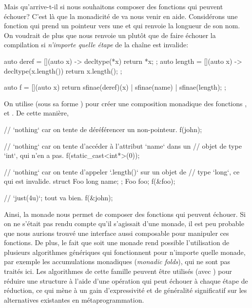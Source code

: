 Mais qu'arrive-t-il si nous souhaitons composer des fonctions qui peuvent
échouer? C'est là que la monadicité de  va nous venir en aide.
Considérons  une fonction qui prend un pointeur vers une 
et qui renvoie la longueur de son nom. On voudrait de plus que  nous
renvoie un  plutôt que de faire échouer la compilation si
\textit{n'importe quelle étape} de la chaîne est invalide:
\begin{cpp}
    auto deref = [](auto x) -> decltype(*x) { return *x; };
    auto length = [](auto x) -> decltype(x.length()) { return x.length(); };

    auto f = [](auto x) {
        return sfinae(deref)(x) | sfinae(name)
                                | sfinae(length);
    };
\end{cpp}

On utilise  (sous sa forme ) pour créer une
composition monadique des fonctions , 
et . De cette manière,
\begin{cpp}
    // `nothing` car on tente de déréférencer un non-pointeur.
    f(john);

    // `nothing` car on tente d'accéder à l'attribut `name` dans un
    // objet de type `int`, qui n'en a pas.
    f(static_cast<int*>(0));

    // `nothing` car on tente d'appeler `.length()` sur un objet de
    // type `long`, ce qui est invalide.
    struct Foo { long name; };
    Foo foo;
    f(&foo);

    // `just(4u)`; tout va bien.
    f(&john);
\end{cpp}

Ainsi, la monade  nous permet de composer des fonctions qui peuvent
échouer. Si on ne s'était pas rendu compte qu'il s'agissait d'une monade, il
est peu probable que nous aurions trouvé une interface aussi composable pour
manipuler ces fonctions. De plus, le fait que  soit une monade
rend possible l'utilisation de plusieurs algorithmes génériques qui
fonctionnent pour n'importe quelle monade, par exemple les accumulations
monadiques (\textit{monadic folds}), qui ne sont pas traités ici. Les
algorithmes de cette famille peuvent être utilisés (avec ) pour
réduire une structure à l'aide d'une opération qui peut échouer à chaque
étape de réduction, ce qui mène à un gain d'expressivité et de généralité
significatif sur les alternatives existantes en métaprogrammation.


